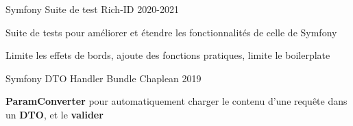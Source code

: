 

\begin{cventries}

	\cventry
	{Symfony}
	{Suite de test}
	{Rich-ID}
	{2020-2021}
	{
		\begin{cvitems} %
			\item {Suite de tests pour améliorer et étendre les fonctionnalités de celle de Symfony}
			\item {Limite les effets de bords, ajoute des fonctions pratiques, limite le boilerplate}
		\end{cvitems}
	}

	\cventry
	{Symfony}
	{DTO Handler Bundle}
	{Chaplean}
	{2019}
	{
		\begin{cvitems} %
			\item {\textbf{ParamConverter} pour automatiquement charger le contenu d'une requête dans un \textbf{DTO}, et le \textbf{valider}}
		\end{cvitems}
	}

\end{cventries}

